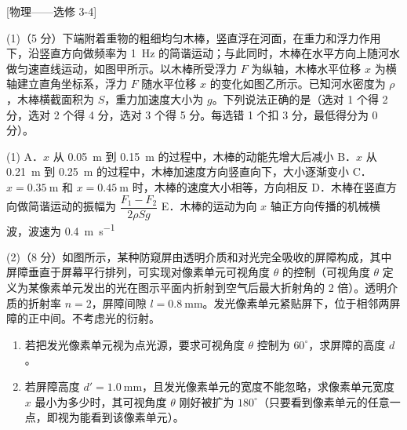 \begin{question}
[物理——选修 3-4]

(1)（5 分）下端附着重物的粗细均匀木棒，竖直浮在河面，在重力和浮力作用下，沿竖直方向做频率为 \SI{1}{\hertz} 的简谐运动；与此同时，木棒在水平方向上随河水做匀速直线运动，如图甲所示。以木棒所受浮力 $F$ 为纵轴，木棒水平位移 $x$ 为横轴建立直角坐标系，浮力 $F$ 随水平位移 $x$ 的变化如图乙所示。已知河水密度为 $\rho$，木棒横截面积为 $S$，重力加速度大小为 $g$。下列说法正确的是\gkblank（选对 1 个得 2 分，选对 2 个得 4 分，选对 3 个得 5 分。每选错 1 个扣 3 分，最低得分为 0 分）。



\begin{gkopts}(1)
  \task A．$x$ 从 \SI{0.05}{\metre} 到 \SI{0.15}{\metre} 的过程中，木棒的动能先增大后减小
  \task B．$x$ 从 \SI{0.21}{\metre} 到 \SI{0.25}{\metre} 的过程中，木棒加速度方向竖直向下，大小逐渐变小
  \task C．$x=\SI{0.35}{\metre}$ 和 $x=\SI{0.45}{\metre}$ 时，木棒的速度大小相等，方向相反
  \task D．木棒在竖直方向做简谐运动的振幅为 $\dfrac{F_{1}-F_{2}}{2\rho Sg}$
  \task E．木棒的运动为向 $x$ 轴正方向传播的机械横波，波速为 \SI{0.4}{\metre\per\second}
\end{gkopts}

(2)（8 分）如图所示，某种防窥屏由透明介质和对光完全吸收的屏障构成，其中屏障垂直于屏幕平行排列，可实现对像素单元可视角度 $\theta$ 的控制（可视角度 $\theta$ 定义为某像素单元发出的光在图示平面内折射到空气后最大折射角的 2 倍）。透明介质的折射率 $n=2$，屏障间隙 $l=\SI{0.8}{\milli\metre}$。发光像素单元紧贴屏下，位于相邻两屏障的正中间。不考虑光的衍射。


\begin{enumerate}[leftmargin=2em, label=(\roman*)]
  \item 若把发光像素单元视为点光源，要求可视角度 $\theta$ 控制为 $60^{\circ}$，求屏障的高度 $d$。
  \item 若屏障高度 $d'=\SI{1.0}{\milli\metre}$，且发光像素单元的宽度不能忽略，求像素单元宽度 $x$ 最小为多少时，其可视角度 $\theta$ 刚好被扩为 $180^{\circ}$（只要看到像素单元的任意一点，即视为能看到该像素单元）。
\end{enumerate}
\end{question}

